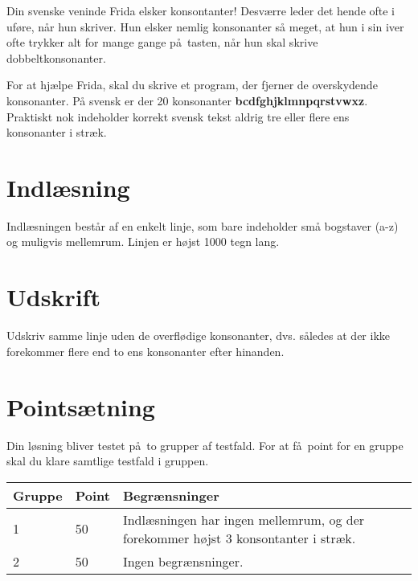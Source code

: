 Din svenske veninde Frida elsker konsontanter!
Desværre leder det hende ofte i uføre, når hun skriver.
Hun elsker nemlig konsonanter så meget, at hun i sin iver ofte trykker alt for mange gange på tasten, når hun skal skrive dobbeltkonsonanter.

For at hjælpe Frida, skal du skrive et program, der fjerner de overskydende konsonanter.
På svensk er der 20 konsonanter
\textbf{bcdfghjklmnpqrstvwxz}.
Praktiskt nok indeholder korrekt svensk tekst aldrig tre eller flere ens konsonanter i stræk.

\section*{Indlæsning}
Indlæsningen består af en enkelt linje, som bare indeholder små bogstaver (a-z) og muligvis mellemrum. 
Linjen er højst 1000 tegn lang.

\section*{Udskrift}
Udskriv samme linje uden de overflødige konsonanter, dvs. således at der ikke forekommer flere end to ens konsonanter efter hinanden.

\section*{Pointsætning}

Din løsning bliver testet på to grupper af testfald.
For at få point for en gruppe skal du klare samtlige testfald i gruppen.

\noindent
\begin{tabular}{| l | l | l |}
\hline
Gruppe & Point & Begrænsninger \\ \hline
1     & 50          &  Indlæsningen har ingen mellemrum, og der forekommer højst 3 konsontanter i stræk.\\ \hline
2     & 50         &  Ingen begrænsninger. \\ \hline
\end{tabular}

